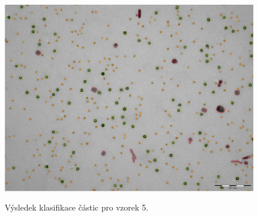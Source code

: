 \documentclass[11pt,twoside,a4paper,table]{book}
\begin{document}
\begin{figure}[h]
\center
\includegraphics[width=\textwidth]{figures/multi7_klasifikace.png}
\label{fig:class1}
\caption{Výsledek klasifikace částic pro vzorek 5.}
\end{figure}
\end{document}
